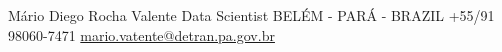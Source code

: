 \documentclass[lighthipster]{simplehipstercv}
\newlength{\rightcolwidth}
\begin{document}
\begin{paracol}{2}
\begin{minipage}[t]{0.3\textwidth}
\vspace{3em}
\end{minipage}






\vfill{} %

\setlength{\parindent}{0pt}
\begin{minipage}[t]{\rightcolwidth}
\begin{center}\fontfamily{\sfdefault}\selectfont \color{black!70}
{\small Mário Diego Rocha Valente  Data Scientist  BELÉM - PARÁ - BRAZIL  \newline {}  +55/91 98060-7471  \protect\url{mario.vatente@detran.pa.gov.br}
}
\end{center}
\end{minipage}
\end{paracol}
\end{document}

